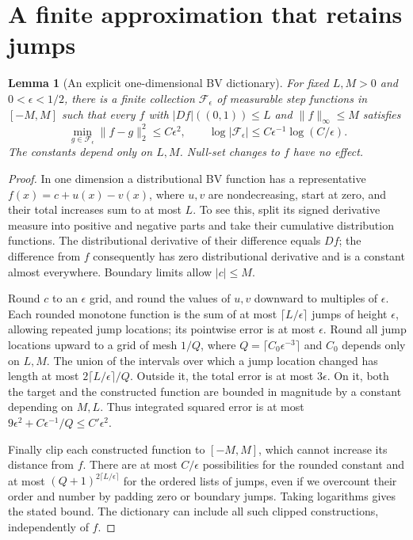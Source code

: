\documentclass[11pt]{article}
\newtheorem{lemma}[theorem]{Lemma}
\theoremstyle{remark}
\begin{document}
\section{A finite approximation that retains jumps}
\begin{lemma}[An explicit one-dimensional BV dictionary]\label{net}
For fixed $L,M>0$ and $0<\epsilon<1/2$, there is a finite collection $\mathcal F_\epsilon$ of measurable step functions in $[-M,M]$ such that every $f$ with $|Df|((0,1))\leq L$ and $\|f\|_\infty\leq M$ satisfies
\[
 \min_{g\in\mathcal F_\epsilon}\|f-g\|_2^2\leq C\epsilon^2,
 \qquad \log|\mathcal F_\epsilon|
       \leq C\epsilon^{-1}\log(C/\epsilon).
\]
The constants depend only on $L,M$. Null-set changes to $f$ have no effect.
\end{lemma}
\begin{proof}
In one dimension a distributional BV function has a representative
$f(x)=c+u(x)-v(x)$, where $u,v$ are nondecreasing, start at zero, and their total increases sum to at most $L$. To see this, split its signed derivative measure into positive and negative parts and take their cumulative distribution functions. The distributional derivative of their difference equals $Df$; the difference from $f$ consequently has zero distributional derivative and is a constant almost everywhere. Boundary limits allow $|c|\leq M$.

Round $c$ to an $\epsilon$ grid, and round the values of $u,v$ downward to multiples of $\epsilon$. Each rounded monotone function is the sum of at most $\lceil L/\epsilon\rceil$ jumps of height $\epsilon$, allowing repeated jump locations; its pointwise error is at most $\epsilon$. Round all jump locations upward to a grid of mesh $1/Q$, where $Q=\lceil C_0\epsilon^{-3}\rceil$ and $C_0$ depends only on $L,M$. The union of the intervals over which a jump location changed has length at most $2\lceil L/\epsilon\rceil/Q$. Outside it, the total error is at most $3\epsilon$. On it, both the target and the constructed function are bounded in magnitude by a constant depending on $M,L$. Thus integrated squared error is at most
$9\epsilon^2+C\epsilon^{-1}/Q\leq C'\epsilon^2$.

Finally clip each constructed function to $[-M,M]$, which cannot increase its distance from $f$. There are at most $C/\epsilon$ possibilities for the rounded constant and at most $(Q+1)^{2\lceil L/\epsilon\rceil}$ for the ordered lists of jumps, even if we overcount their order and number by padding zero or boundary jumps. Taking logarithms gives the stated bound. The dictionary can include all such clipped constructions, independently of $f$.
\end{proof}
\end{document}
